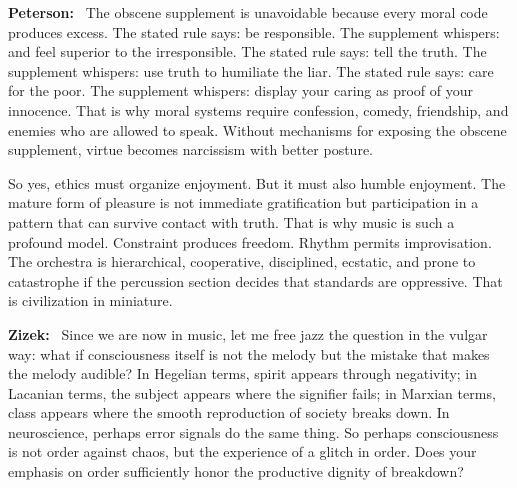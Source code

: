 \documentclass[a4paper,11pt]{article}
\newenvironment{question}{\par\noindent\color{ALIUSRed}\textbf{Zizek:}\ }{\par}
\newenvironment{answer}{\par\noindent\color{black}\textbf{Peterson:}\ }{\par}
\begin{document}
\begin{answer}
The obscene supplement is unavoidable because every moral code produces excess. The stated rule says: be responsible. The supplement whispers: and feel superior to the irresponsible. The stated rule says: tell the truth. The supplement whispers: use truth to humiliate the liar. The stated rule says: care for the poor. The supplement whispers: display your caring as proof of your innocence. That is why moral systems require confession, comedy, friendship, and enemies who are allowed to speak. Without mechanisms for exposing the obscene supplement, virtue becomes narcissism with better posture.

So yes, ethics must organize enjoyment. But it must also humble enjoyment. The mature form of pleasure is not immediate gratification but participation in a pattern that can survive contact with truth. That is why music is such a profound model. Constraint produces freedom. Rhythm permits improvisation. The orchestra is hierarchical, cooperative, disciplined, ecstatic, and prone to catastrophe if the percussion section decides that standards are oppressive. That is civilization in miniature.
\end{answer}

\begin{question}
Since we are now in music, let me free jazz the question in the vulgar way: what if consciousness itself is not the melody but the mistake that makes the melody audible? In Hegelian terms, spirit appears through negativity; in Lacanian terms, the subject appears where the signifier fails; in Marxian terms, class appears where the smooth reproduction of society breaks down. In neuroscience, perhaps error signals do the same thing. So perhaps consciousness is not order against chaos, but the experience of a glitch in order. Does your emphasis on order sufficiently honor the productive dignity of breakdown?
\end{question}
\end{document}
